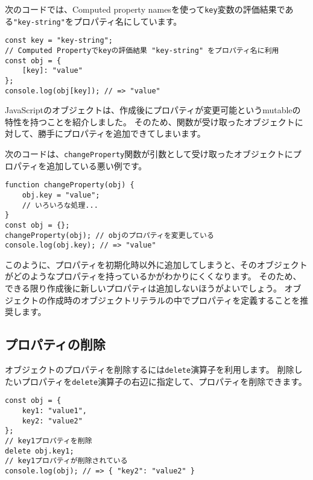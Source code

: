 次のコードでは、Computed property
namesを使って\texttt{key}変数の評価結果である\texttt{"key-string"}をプロパティ名にしています。

\begin{lstlisting}
const key = "key-string";
// Computed Propertyでkeyの評価結果 "key-string" をプロパティ名に利用
const obj = {
    [key]: "value"
};
console.log(obj[key]); // => "value"
\end{lstlisting}

JavaScriptのオブジェクトは、作成後にプロパティが変更可能というmutableの特性を持つことを紹介しました。
そのため、関数が受け取ったオブジェクトに対して、勝手にプロパティを追加できてしまいます。

次のコードは、\texttt{changeProperty}関数が引数として受け取ったオブジェクトにプロパティを追加している悪い例です。

\begin{lstlisting}
function changeProperty(obj) {
    obj.key = "value";
    // いろいろな処理...
}
const obj = {};
changeProperty(obj); // objのプロパティを変更している
console.log(obj.key); // => "value"
\end{lstlisting}

このように、プロパティを初期化時以外に追加してしまうと、そのオブジェクトがどのようなプロパティを持っているかがわかりにくくなります。
そのため、できる限り作成後に新しいプロパティは追加しないほうがよいでしょう。
オブジェクトの作成時のオブジェクトリテラルの中でプロパティを定義することを推奨します。

\hypertarget{remove-property}{%
\subsection{プロパティの削除}\label{remove-property}}

オブジェクトのプロパティを削除するには\texttt{delete}演算子を利用します。
削除したいプロパティを\texttt{delete}演算子の右辺に指定して、プロパティを削除できます。

\begin{lstlisting}
const obj = {
    key1: "value1",
    key2: "value2"
};
// key1プロパティを削除
delete obj.key1;
// key1プロパティが削除されている
console.log(obj); // => { "key2": "value2" }
\end{lstlisting}

